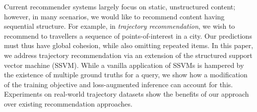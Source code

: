 
Current recommender systems largely focus on static, unstructured content;
however, in many scenarios, we would like to recommend content having sequential structure.
For example, in \emph{trajectory recommendation}, we wish to recommend to travellers a sequence of points-of-interest in a city.
Our predictions must thus have global cohesion, while also omitting repeated items.
In this paper, we address trajectory recommendation via an extension of the structured support vector machine (SSVM).
While a vanilla application of SSVMs is hampered by the existence of multiple ground truths for a query,
we show how a modification of the training objective and loss-augmented inference can account for this.
Experiments on real-world trajectory datasets show the benefits of our approach over existing recommendation approaches.





